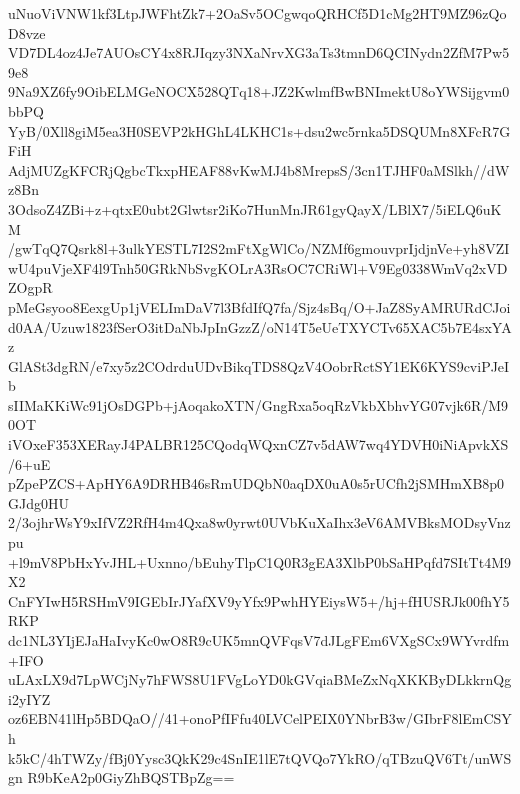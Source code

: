uNuoViVNW1kf3LtpJWFhtZk7+2OaSv5OCgwqoQRHCf5D1cMg2HT9MZ96zQoD8vze
VD7DL4oz4Je7AUOsCY4x8RJIqzy3NXaNrvXG3aTs3tmnD6QCINydn2ZfM7Pw59e8
9Na9XZ6fy9OibELMGeNOCX528QTq18+JZ2KwlmfBwBNImektU8oYWSijgvm0bbPQ
YyB/0Xll8giM5ea3H0SEVP2kHGhL4LKHC1s+dsu2wc5rnka5DSQUMn8XFcR7GFiH
AdjMUZgKFCRjQgbcTkxpHEAF88vKwMJ4b8MrepsS/3cn1TJHF0aMSlkh//dWz8Bn
3OdsoZ4ZBi+z+qtxE0ubt2Glwtsr2iKo7HunMnJR61gyQayX/LBlX7/5iELQ6uKM
/gwTqQ7Qsrk8l+3ulkYESTL7I2S2mFtXgWlCo/NZMf6gmouvprIjdjnVe+yh8VZI
wU4puVjeXF4l9Tnh50GRkNbSvgKOLrA3RsOC7CRiWl+V9Eg0338WmVq2xVDZOgpR
pMeGsyoo8EexgUp1jVELImDaV7l3BfdIfQ7fa/Sjz4sBq/O+JaZ8SyAMRURdCJoi
d0AA/Uzuw1823fSerO3itDaNbJpInGzzZ/oN14T5eUeTXYCTv65XAC5b7E4sxYAz
GlASt3dgRN/e7xy5z2COdrduUDvBikqTDS8QzV4OobrRctSY1EK6KYS9cviPJeIb
sIIMaKKiWc91jOsDGPb+jAoqakoXTN/GngRxa5oqRzVkbXbhvYG07vjk6R/M90OT
iVOxeF353XERayJ4PALBR125CQodqWQxnCZ7v5dAW7wq4YDVH0iNiApvkXS/6+uE
pZpePZCS+ApHY6A9DRHB46sRmUDQbN0aqDX0uA0s5rUCfh2jSMHmXB8p0GJdg0HU
2/3ojhrWsY9xIfVZ2RfH4m4Qxa8w0yrwt0UVbKuXaIhx3eV6AMVBksMODsyVnzpu
+l9mV8PbHxYvJHL+Uxnno/bEuhyTlpC1Q0R3gEA3XlbP0bSaHPqfd7SItTt4M9X2
CnFYIwH5RSHmV9IGEbIrJYafXV9yYfx9PwhHYEiysW5+/hj+fHUSRJk00fhY5RKP
dc1NL3YIjEJaHaIvyKc0wO8R9cUK5mnQVFqsV7dJLgFEm6VXgSCx9WYvrdfm+IFO
uLAxLX9d7LpWCjNy7hFWS8U1FVgLoYD0kGVqiaBMeZxNqXKKByDLkkrnQgi2yIYZ
oz6EBN41lHp5BDQaO//41+onoPfIFfu40LVCelPEIX0YNbrB3w/GIbrF8lEmCSYh
k5kC/4hTWZy/fBj0Yysc3QkK29c4SnIE1lE7tQVQo7YkRO/qTBzuQV6Tt/unWSgn
R9bKeA2p0GiyZhBQSTBpZg==
